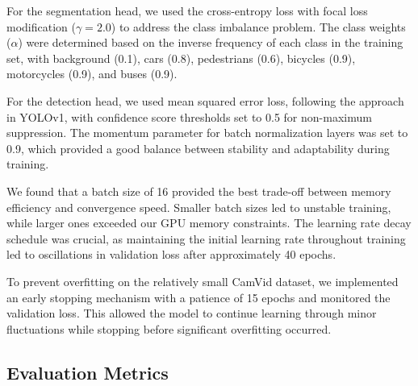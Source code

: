 \documentclass[conference]{IEEEtran}
\begin{document}


For the segmentation head, we used the cross-entropy loss with focal loss modification ($\gamma=2.0$) to address the class imbalance problem. The class weights ($\alpha$) were determined based on the inverse frequency of each class in the training set, with background (0.1), cars (0.8), pedestrians (0.6), bicycles (0.9), motorcycles (0.9), and buses (0.9).

For the detection head, we used mean squared error loss, following the approach in YOLOv1, with confidence score thresholds set to 0.5 for non-maximum suppression. The momentum parameter for batch normalization layers was set to 0.9, which provided a good balance between stability and adaptability during training.

We found that a batch size of 16 provided the best trade-off between memory efficiency and convergence speed. Smaller batch sizes led to unstable training, while larger ones exceeded our GPU memory constraints. The learning rate decay schedule was crucial, as maintaining the initial learning rate throughout training led to oscillations in validation loss after approximately 40 epochs.

To prevent overfitting on the relatively small CamVid dataset, we implemented an early stopping mechanism with a patience of 15 epochs and monitored the validation loss. This allowed the model to continue learning through minor fluctuations while stopping before significant overfitting occurred.



\subsection{Evaluation Metrics}


\end{document}

